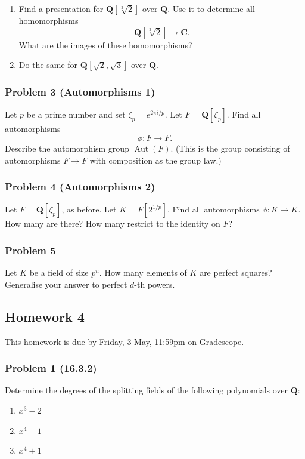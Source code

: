 \documentclass[11pt]{article}
\begin{document}
\begin{enumerate}
\item Find a presentation for \(\mathbf{Q}[\sqrt[3]{2}]\) over \(\mathbf{Q}\).
Use it to determine all homomorphisms
\[ \mathbf{Q}[\sqrt[3] 2] \to \mathbf{C}.\]
What are the images of these homomorphisms?

\item Do the same for \(\mathbf{Q}[\sqrt 2, \sqrt 3]\) over \(\mathbf{Q}\).
\end{enumerate}
\subsubsection{Problem 3 (Automorphisms 1)}
\label{sec:org776bbcf}

Let \(p\) be a prime number and set \(\zeta_p = e^{2\pi i / p}\).
Let \(F = \mathbf{Q}[\zeta_p]\).
Find all automorphisms
\[ \phi \colon F \to F.\]
Describe the automorphism group \(\operatorname{Aut}(F)\).
(This is the group consisting of automorphisms \(F \to F\) with composition as the group law.)
\subsubsection{Problem 4 (Automorphisms 2)}
\label{sec:org2caeda8}

Let \(F = \mathbf{Q}[\zeta_p]\), as before.
Let \(K = F[2^{1/p}]\).
Find all automorphisms \(\phi \colon K \to K\).
How many are there?
How many restrict to the identity on \(F\)?
\subsubsection{Problem 5}
\label{sec:org46424e2}

Let \(K\) be a field of size \(p^n\).
How many elements of \(K\) are perfect squares?
Generalise your answer to perfect \(d\)-th powers.
\subsection{Homework 4}
\label{sec:org65258d5}
This homework is due by Friday, 3 May, 11:59pm on Gradescope.
\subsubsection{Problem 1  (16.3.2)}
\label{sec:org35ec697}

Determine the degrees of the splitting fields of the following polynomials over \(\mathbf{Q}\):
\begin{enumerate}
\item \(x^3-2\)
\item \(x^4-1\)
\item \(x^4+1\)
\end{enumerate}
\end{document}
